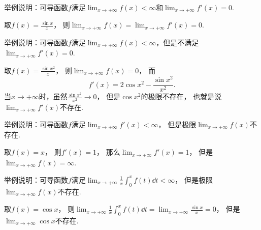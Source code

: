 \begin{example}
举例说明：可导函数\(f\)满足\(\lim_{x\to+\infty} f(x) < \infty\)和\(\lim_{x\to+\infty} f'(x) = 0\).
\begin{solution}
取\(f(x) = \frac{\sin x}{x}\)，
则\(\lim_{x\to+\infty} f(x) = \lim_{x\to+\infty} f'(x) = 0\).
\end{solution}
\end{example}
\begin{example}
举例说明：可导函数\(f\)满足\(\lim_{x\to+\infty} f(x) < \infty\)，但是不满足\(\lim_{x\to+\infty} f'(x) = 0\).
\begin{solution}
取\(f(x) = \frac{\sin x^2}{x}\)，
则\(\lim_{x\to+\infty} f(x) = 0\)，
而\begin{equation*}
	f'(x) = 2 \cos x^2 - \frac{\sin x^2}{x^2}.
\end{equation*}
当\(x\to+\infty\)时，虽然\(\frac{\sin x^2}{x^2} \to 0\)，
但是\(\cos x^2\)的极限不存在，
也就是说\(\lim_{x\to+\infty} f'(x)\)不存在.
\end{solution}
\end{example}
\begin{example}
举例说明：可导函数\(f\)满足\(\lim_{x\to+\infty} f'(x) < \infty\)，
但是极限\(\lim_{x\to+\infty} f(x)\)不存在.
\begin{solution}
取\(f(x) = x\)，
则\(f'(x) = 1\)，
那么\(\lim_{x\to+\infty} f'(x) = 1\)，
但是\(\lim_{x\to+\infty} f(x) = \infty\).
\end{solution}
\end{example}
\begin{example}
举例说明：可导函数\(f\)满足\(\lim_{x\to+\infty} \frac1x \int_0^x f(t) \dd{t} < \infty\)，
但是极限\(\lim_{x\to+\infty} f(x)\)不存在.
\begin{solution}
取\(f(x) = \cos x\)，
则\(\lim_{x\to+\infty} \frac1x \int_0^x f(t) \dd{t}
= \lim_{x\to+\infty} \frac{\sin x}x
= 0\)，
但是\(\lim_{x\to+\infty} \cos x\)不存在.
\end{solution}
\end{example}

